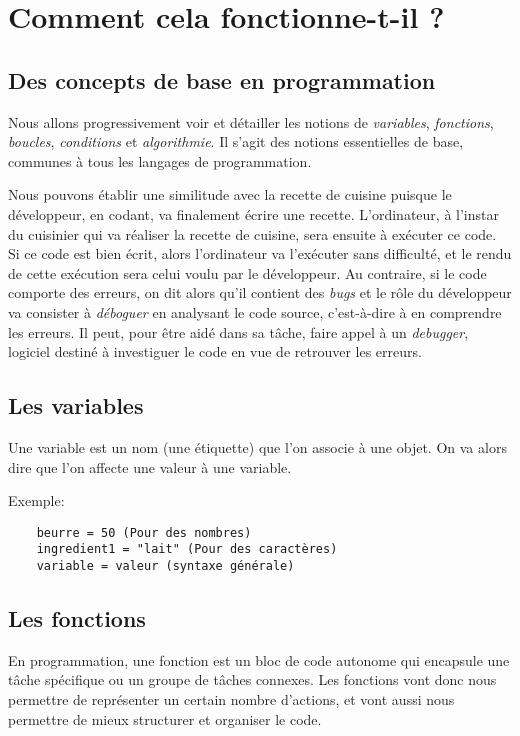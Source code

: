 \chapter{Comment cela fonctionne-t-il ?}
\section{Des concepts de base en programmation}
Nous allons progressivement voir et détailler les notions de \textit{variables}, \textit{fonctions}, \textit{boucles}, \textit{conditions} et \textit{algorithmie}. Il s'agit des notions essentielles de base, communes à tous les langages de programmation.
\medskip

Nous pouvons établir une similitude avec la recette de cuisine puisque le développeur, en codant, va finalement écrire une recette. L'ordinateur, à l'instar du cuisinier qui va réaliser la recette de cuisine, sera ensuite à exécuter ce code. Si ce code est bien écrit, alors l'ordinateur va l'exécuter sans difficulté, et le rendu de cette exécution sera celui voulu par le développeur. Au contraire, si le code comporte des erreurs, on dit alors qu'il contient des \textit{bugs} et le rôle du développeur va consister à \textit{déboguer} en analysant le code source, c'est-à-dire à en comprendre les erreurs. Il peut, pour être aidé dans sa tâche, faire appel à un \textit{debugger}, logiciel destiné à investiguer le code en vue de retrouver les erreurs.
\medskip

\section{Les variables}
Une variable est un nom (une étiquette) que l'on associe à une objet. On va alors dire que l'on affecte une valeur à une variable.
\medskip

Exemple:
\begin{verbatim}
    beurre = 50 (Pour des nombres)
    ingredient1 = "lait" (Pour des caractères)
    variable = valeur (syntaxe générale)
\end{verbatim}
\medskip

\section{Les fonctions}
En programmation, une fonction est un bloc de code autonome qui encapsule une tâche spécifique ou un groupe de tâches connexes. Les fonctions vont donc nous permettre de représenter un certain nombre d'actions, et vont aussi nous permettre de mieux structurer et organiser le code.
\medskip

